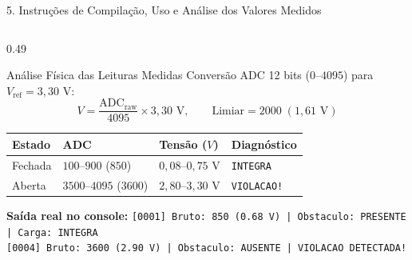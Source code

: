 \documentclass[aspectratio=169,10pt]{beamer}
\begin{document}
\begin{frame}[fragile]{5. Instru\c{c}\~{o}es de Compila\c{c}\~{a}o, Uso e An\'{a}lise dos Valores Medidos}
\begin{columns}[T,onlytextwidth]
    \begin{column}{0.49\textwidth}
      \begin{exampleblock}{An\'{a}lise F\'{i}sica das Leituras Medidas}
        \scriptsize
        Convers\~{a}o ADC 12 bits ($0$--$4095$) para $V_{\text{ref}} = 3{,}30\text{ V}$:
        \[
          V = \frac{\text{ADC}_{\text{raw}}}{4095}\times 3{,}30\text{ V}, \qquad \text{Limiar} = 2000 \;(1{,}61\text{ V})
        \]
        \begin{tabular}{llll}
          \toprule
          \textbf{Estado} & \textbf{ADC} & \textbf{Tens\~{a}o ($V$)} & \textbf{Diagn\'{o}stico} \\
          \midrule
          Fechada & $100$--$900$ ($850$) & $0{,}08$--$0{,}75\text{ V}$ & \texttt{INTEGRA} \\
          Aberta & $3500$--$4095$ ($3600$) & $2{,}80$--$3{,}30\text{ V}$ & \texttt{VIOLACAO!} \\
          \bottomrule
        \end{tabular}
      \end{exampleblock}
      \vspace{0.08cm}
      \scriptsize
      \textbf{Sa\'{i}da real no console:}
      \texttt{[0001] Bruto: 850 (0.68 V) | Obstaculo: PRESENTE | Carga: INTEGRA}\\
      \texttt{[0004] Bruto: 3600 (2.90 V) | Obstaculo: AUSENTE | VIOLACAO DETECTADA!}
    \end{column}
  \end{columns}
\end{frame}
\end{document}
